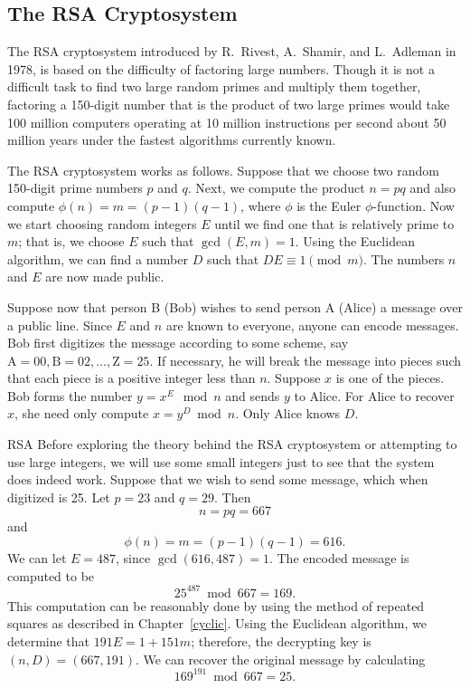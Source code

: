 \subsection*{The RSA Cryptosystem}
 
The RSA cryptosystem introduced by R.~Rivest,
A.~Shamir, and L.~Adleman in
1978, is based on the difficulty of factoring large numbers. Though it
is not a difficult task to find two large random primes and multiply
them together, factoring a 150-digit number that is the product of two
large primes would take 100 million computers operating at 10 million
instructions per second about 50 million years under the fastest
algorithms currently known.
 
 
The RSA cryptosystem
works as follows. Suppose that we choose two random 150-digit prime
numbers $p$ and $q$. Next, we compute the product $n= pq$ and also
compute $\phi(n) = m = (p - 1)(q-1)$, where $\phi$ is the Euler
$\phi$-function.  Now we start choosing random integers $E$ until we
find one that is relatively prime to $m$; that is, we choose $E$ such
that $\gcd(E, m) = 1$. Using the Euclidean algorithm, we can find a
number $D$ such that \mbox{$DE \equiv 1 \pmod{m}$}. The numbers $n$ and $E$
are now made public. 
 
 
Suppose now that person B (Bob) wishes to send person A (Alice) a
message over a public line. Since $E$ and $n$ are known to everyone,
anyone can encode messages. Bob first digitizes the message according
to some scheme, say $\mbox{A}  = 00, \mbox{B}  = 02, \ldots, \mbox{Z}=
25$. If necessary, he will break the message into pieces such that
each piece is a positive integer less than $n$.  Suppose $x$ is one of
the pieces.  Bob forms the number $y = x^E \mod n$ and sends $y$ to
Alice. For Alice to recover $x$, she need only compute $x = y^D \bmod
n$. Only Alice knows $D$.  
 
 
\begin{example}{RSA}
Before exploring the theory behind the RSA cryptosystem or attempting
to use large integers, we will use some small integers just to see
that the system does indeed work. Suppose that we wish to send some
message, which when digitized is 25. Let $p = 23$ and $q = 29$. Then 
\[
n = pq = 667
\]
and
\[
\phi(n) = m = (p - 1)(q - 1) = 616.
\]
We can let $E = 487$, since $\gcd(616, 487) = 1$. The encoded message
is computed to be  
\[
25^{487} \bmod 667 = 169.
\]
This computation can be reasonably done by using the method of
repeated squares as described in Chapter~\ref{cyclic}. Using the Euclidean
algorithm, we determine that $191 E = 1 + 151 m$; therefore, the
decrypting key is $(n, D) = ( 667, 191)$. We can recover the original 
message by calculating  
\[
169^{191} \bmod 667 = 25.
\]
\end{example}

